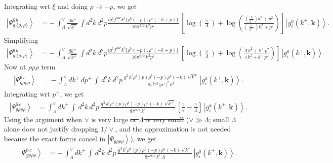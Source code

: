\documentclass[aps,prd,amsmath,amssymb,nofootinbib]{revtex4-2}
\numberwithin{equation}{section}
\begin{document}
Integrating wrt $\xi$ and doing $p\rightarrow -p$, we get
\begin{align}
    \left|\Psi_{g\,\{\rho,\rho\}}^{6\, b}\right\rangle & =-\,\int_{\Lambda}^{\vee} \frac{dk^{+}}{\sqrt{k^{+}}}\, \int d^{2}k \, d^{2}p \frac{ig^{3}f^{abc}k^{i}\{\rho^{b}(-p),\rho^{c}(-k+p)\}}{16\pi^{9/2}\,k^{2}p^{2}}\,\left[\log{\left(\frac{\vee}{\Lambda}\right)}+\log{\left(\frac{\left(\frac{\Lambda}{k^{+}}\right) k^{2}+p^{2}}{\left(\frac{\vee}{k^{+}} \right)k^{2}+p^{2}}\right)}\right]\,\left|g_{i}^{a}(k^{+},\mathbf{k})\right\rangle.
\end{align}
Simplifying
\begin{align}\label{tworhoafter}
    \left|\Psi_{g\,\{\rho,\rho\}}^{6\, b}\right\rangle & =-\,\int_{\Lambda}^{\vee} \frac{dk^{+}}{\sqrt{k^{+}}}\, \int d^{2}k \, d^{2}p \frac{ig^{3}f^{abc}k^{i}\{\rho^{b}(-p),\rho^{c}(-k+p)\}}{16\pi^{9/2}\,k^{2}p^{2}}\,\left[\log{\left(\frac{\vee}{\Lambda}\right)}+\log{\left(\frac{\Lambda\, k^{2} + k^{+}\,p^{2}}{\vee k^{2}+k^{+}\,p^{2}}\right)}\right]\,\left|g_{i}^{a}(k^{+},\mathbf{k})\right\rangle.
\end{align}
Now at $\rho\rho\rho$ term
\begin{align}
    \left|\Psi_{g\rho\rho\rho}^{6\, c}\right\rangle & = -\, \int_{\Lambda}^{\vee} dk^{+}\, dp^{+}\, \int\, d^{2}k\, d^{2}p\, \frac{g^{3}\, k^{i}\rho^{b}(p)\rho^{b}(-p)\rho^{a}(-k)\,\sqrt{k^{+}}}{8\pi^{9/2}\,|p^{+}|^{2}\,k^{4}}\,\left|g_{i}^{a}(k^{+},\mathbf{k})\right\rangle. 
\end{align}
Integrating wrt $p^{+}$, we get
\begin{align}
    \left|\Psi_{g\rho\rho\rho}^{6\, c}\right\rangle & = \int_{\Lambda}^{\vee} dk^{+}\, \int\, d^{2}k\, d^{2}p\, \frac{g^{3}\, k^{i}\rho^{b}(p)\rho^{b}(-p)\rho^{a}(-k)\,\sqrt{k^{+}}}{8\pi^{9/2}\,k^{4}}\, \left[\frac{1}{\vee}-\frac{1}{\Lambda}\right]\,\left|g_{i}^{a}(k^{+},\mathbf{k})\right\rangle.
\end{align}
Using the argument when $\vee$ is very large {\color{orange}\sout{or $\Lambda$ is very small}}{\color{red} ($\vee\gg\Lambda$; small $\Lambda$ alone does not justify dropping $1/\vee$, and the approximation is not needed because the exact forms cancel in $\left|\Psi_{g\rho\rho\rho}\right\rangle$)}, we get
\begin{align}\label{threerhoafter}
        \left|\Psi_{g\rho\rho\rho}^{6\, c}\right\rangle & = -\,\int_{\Lambda}^{\vee} dk^{+}\, \int\, d^{2}k\, d^{2}p\, \frac{g^{3}\, k^{i}\rho^{b}(p)\rho^{b}(-p)\rho^{a}(-k)\,\sqrt{k^{+}}}{8\pi^{9/2}\,k^{4}\, \Lambda}\,\left|g_{i}^{a}(k^{+},\mathbf{k})\right\rangle.
\end{align}
\end{document}
